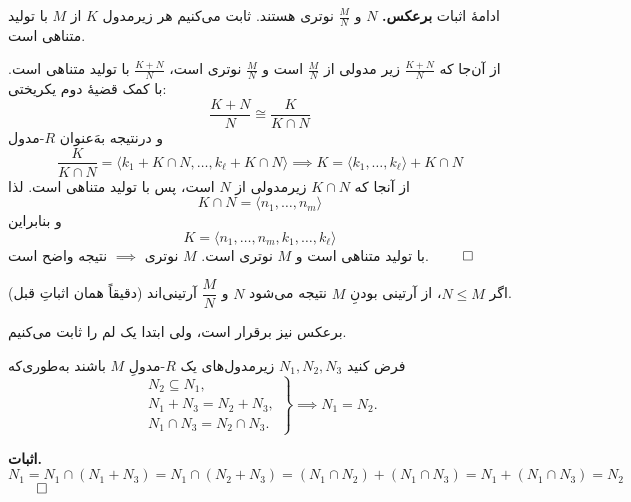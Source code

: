 \begin{frame}{ادامهٔ اثبات}
    \textbf{برعکس.}
    \(N\)
    و
    \(\frac{M}{N}\)
    نوتری هستند. ثابت می‌کنیم هر زیرمدول
    \(K\)
    از
    \(M\)
    با تولید متناهی است.

    از آن‌جا که
    \(\frac{K+N}{N}\)
    زیر مدولی از
    \(\frac{M}{N}\)
    است و
    \(\frac{M}{N}\)
    نوتری است،‌
    \(\frac{K+N}{N}\)
    با تولید متناهی است. با کمک قضیهٔ دوم یکریختی:
    \[
        \frac{K+N}{N} \cong \frac{K}{K \cap N}
    \]
    و درنتیجه به‌َعنوان
    \(R\)-مدول
    \[
        \frac{K}{K \cap N} = \langle k_1 + K \cap N, \dots, k_\ell + K \cap N \rangle \implies K = \langle k_1, \dots, k_\ell \rangle + K \cap N
    \]
    از آنجا که
    \( K \cap N\)
    زیرمدولی از
    \(N\)
    است،‌ پس با تولید متناهی است. لذا
    \[
        K \cap N = \langle n_1, \dots, n_m \rangle
    \]
    و بنابراین
    \[
        K = \langle n_1, \dots, n_m, k_1, \dots, k_\ell \rangle
    \]
    با تولید متناهی است و
    \(M\)
    نوتری است.
    $M$ نوترى $\implies$ نتیجه واضح است.
    \hfill\(\qed\)
\end{frame}

\begin{frame}
    \begin{theorem}
        اگر $N\le M$، از آرتینی بودنِ $M$ نتیجه می‌شود $N$ و $\dfrac{M}{N}$ آرتینی‌اند (دقیقاً همان اثباتِ قبل).

    \end{theorem}
    برعکس نیز برقرار است، ولی ابتدا یک لم را ثابت می‌کنیم.
    \begin{lemma}
        فرض کنید $N_1,N_2,N_3$ زیرمدول‌های یک $R$-مدولِ $M$ باشند به‌طوری‌که
        \[
            \left.
            \begin{aligned}
                N_2\subseteq N_1, \\
                N_1+N_3=N_2+N_3,  \\
                N_1\cap N_3=N_2\cap N_3.
            \end{aligned}
            \right\}
            \implies
            N_1=N_2.
        \]
    \end{lemma}

    \textbf{اثبات.}
    \[
        N_1
        = N_1\cap (N_1+N_3)
        = N_1\cap (N_2+N_3)
        = (N_1\cap N_2)+(N_1\cap N_3)
        = N_1+(N_1\cap N_3)
        = N_2
    \]
    \hfill\(\qed\)

\end{frame}



